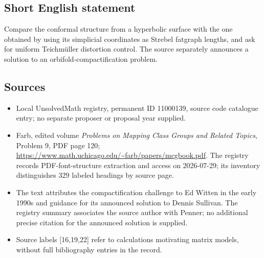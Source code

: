 \documentclass[11pt]{article}
\begin{document}
\subsection{Short English statement}
Compare the conformal structure from a hyperbolic surface with the one obtained by using its simplicial coordinates as Strebel fatgraph lengths, and ask for uniform Teichm\"uller distortion control. The source separately announces a solution to an orbifold-compactification problem.
\subsection{Sources}
\begin{itemize}
\item Local UnsolvedMath registry, permanent ID 11000139, source code catalogue entry; no separate proposer or proposal year supplied.
\item Farb, edited volume \emph{Problems on Mapping Class Groups and Related Topics}, Problem 9, PDF page 120; \url{https://www.math.uchicago.edu/~farb/papers/mcgbook.pdf}. The registry records PDF-font-structure extraction and access on 2026-07-29; its inventory distinguishes 329 labeled headings by source page.
\item The text attributes the compactification challenge to Ed Witten in the early 1990s and guidance for its announced solution to Dennis Sullivan. The registry summary associates the source author with Penner; no additional precise citation for the announced solution is supplied.
\item Source labels [16,19,22] refer to calculations motivating matrix models, without full bibliography entries in the record.
\end{itemize}
\end{document}
